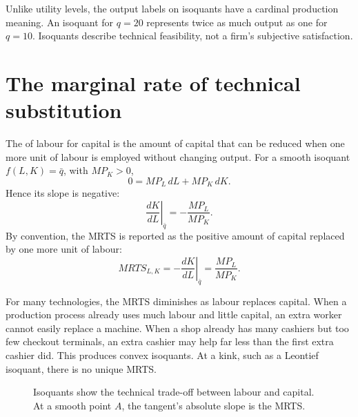 Unlike utility levels, the output labels on isoquants have a cardinal
production meaning. An isoquant for $q=20$ represents twice as much output as
one for $q=10$. Isoquants describe technical feasibility, not a firm's
subjective satisfaction.

\section{The marginal rate of technical substitution}

The  of labour for capital is
the amount of capital that can be reduced when one more unit of labour is
employed without changing output. For a smooth isoquant
$f(L,K)=\bar q$, with $MP_K>0$,
\[
0=MP_L\,dL+MP_K\,dK.
\]
Hence its slope is negative:
\[
\left.\frac{dK}{dL}\right|_{\bar q}
=-\frac{MP_L}{MP_K}.
\]
By convention, the MRTS is reported as the positive amount of capital
replaced by one more unit of labour:
\[
MRTS_{L,K}
=-\left.\frac{dK}{dL}\right|_{\bar q}
=\frac{MP_L}{MP_K}.
\]

For many technologies, the MRTS diminishes as labour replaces capital. When a
production process already uses much labour and little capital, an extra
worker cannot easily replace a machine. When a shop already has many cashiers
but too few checkout terminals, an extra cashier may help far less than the
first extra cashier did. This produces convex isoquants. At a kink, such as a
Leontief isoquant, there is no unique MRTS.

\begin{figure}[!ht]
  \centering
  \caption{Isoquants show the technical trade-off between labour and capital. At a smooth point $A$, the tangent's absolute slope is the MRTS.}
  \label{fig:isoquants-mrts}
\end{figure}
\FloatBarrier

